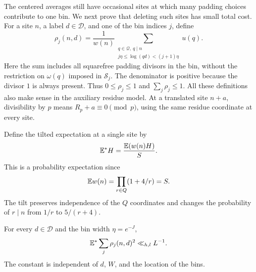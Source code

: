 The centered averages still have occasional sites at which many padding
choices contribute to one bin.  We next prove that deleting such sites
has small total cost.  For a site $n$, a label $d\in\mathcal D$, and one of
the bin indices $j$, define
\begin{equation}\label{q:rho}
 \rho_j(n,d)=\frac1{w(n)}
   \sum_{\substack{q\in\mathcal Q,\ q\mid n\\
          j\eta\le\log(qd)<(j+1)\eta}}u(q).
\end{equation}
Here the sum includes all squarefree padding divisors in the bin, without
the restriction on $\omega(q)$ imposed in $\mathcal S_j$.
The denominator is positive because the divisor $1$ is always present.
Thus $0\le\rho_j\le1$ and $\sum_j\rho_j\le1$.
All these definitions also make sense in the auxiliary residue model.
At a translated site $n+a$, divisibility by $p$ means
$R_p+a\equiv0\pmod p$, using the same residue coordinate at every site.

Define the tilted expectation at a single site by
\[
 \mathbb E^* H=\frac{\mathbb E(w(n)H)}S.
\]
This is a probability expectation since
\[
 \mathbb E w(n)=\prod_{r\in Q}(1+4/r)=S.
\]
The tilt preserves independence of the $Q$ coordinates and changes the
probability of $r\mid n$ from $1/r$ to $5/(r+4)$.

\begin{lemma}\label{q:padding}
For every $d\in\mathcal D$ and the bin width $\eta=e^{-J}$,
\begin{equation}\label{q:padding-square}
 \mathbb E^*\sum_j\rho_j(n,d)^2\ll_{h,l}L^{-1}.
\end{equation}
The constant is independent of $d$, $W$, and the location of the bins.
\end{lemma}

